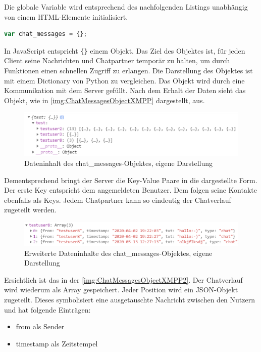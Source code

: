 \documentclass[a4paper,titlepage,halfparskip,12pt]{scrreprt}
\begin{document}
\begin{onehalfspacing}
Die globale Variable wird entsprechend des nachfolgenden Listings unabhängig von einem HTML-Elemente initialisiert.
\begin{lstlisting}[language=Javascript,caption=Initialisierung des chatmessages Objekt,label={lst:ChatMessagesObject}]
var chat_messages = {};
\end{lstlisting}
In JavaScript entspricht \texttt{\{\}} einem Objekt. Das Ziel des Objektes ist, für jeden Client seine Nachrichten und Chatpartner temporär zu halten, um durch Funktionen einen schnellen Zugriff zu erlangen. Die Darstellung des Objektes ist mit einem Dictionary von Python zu vergleichen. Das Objekt wird durch eine Kommunikation mit dem Server gefüllt. Nach dem Erhalt der Daten sieht das Objekt, wie in \autoref{img:ChatMessagesObjectXMPP} dargestellt, aus.
\begin{figure}[h]
	\centering
	\includegraphics[width=\linewidth]{images/ChatMessagesObjectXMPP}
	\caption{Dateninhalt des chat\_messages-Objektes, eigene Darstellung}
	\label{img:ChatMessagesObjectXMPP}
\end{figure} 
Dementsprechend bringt der Server die Key-Value Paare in die dargestellte Form. Der erste Key entspricht dem angemeldeten Benutzer. Dem folgen seine Kontakte ebenfalls als Keys. Jedem Chatpartner kann so eindeutig der Chatverlauf zugeteilt werden.
\begin{figure}[h]
	\centering
	\includegraphics[width=\linewidth]{images/ChatMessagesObjectXMPP2}
	\caption{Erweiterte Dateninhalte des chat\_messages-Objektes, eigene Darstellung}
	\label{img:ChatMessagesObjectXMPP2}
\end{figure}
Ersichtlich ist das in der \autoref{img:ChatMessagesObjectXMPP2}. Der Chatverlauf wird wiederum als Array gespeichert. Jeder Position wird ein JSON-Objekt zugeteilt. Dieses symbolisiert eine ausgetauschte Nachricht zwischen den Nutzern und hat folgende Einträgen:
\begin{itemize}
	\item from als Sender
	\item timestamp als Zeitstempel

\end{itemize}
\end{onehalfspacing}
\end{document}
